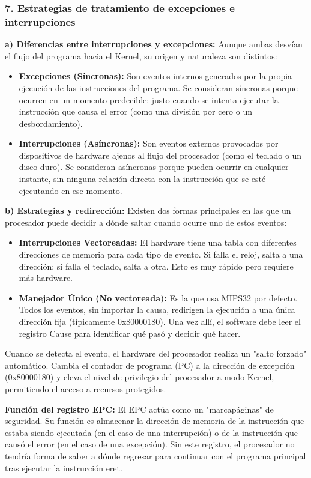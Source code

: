 \documentclass[12pt,a4paper]{article}
\begin{document}
\subsubsection{7. Estrategias de tratamiento de excepciones e interrupciones}

\textbf{a) Diferencias entre interrupciones y excepciones:} Aunque ambas desvían el flujo del programa hacia el Kernel, su origen y naturaleza son distintos:
\begin{itemize}
    \item \textbf{Excepciones (Síncronas):} Son eventos internos generados por la propia ejecución de las instrucciones del programa. Se consideran síncronas porque ocurren en un momento predecible: justo cuando se intenta ejecutar la instrucción que causa el error (como una división por cero o un desbordamiento).
    \item \textbf{Interrupciones (Asíncronas):} Son eventos externos provocados por dispositivos de hardware ajenos al flujo del procesador (como el teclado o un disco duro). Se consideran asíncronas porque pueden ocurrir en cualquier instante, sin ninguna relación directa con la instrucción que se esté ejecutando en ese momento.
\end{itemize}

\textbf{b) Estrategias y redirección:} Existen dos formas principales en las que un procesador puede decidir a dónde saltar cuando ocurre uno de estos eventos:
\begin{itemize}
    \item \textbf{Interrupciones Vectoreadas:} El hardware tiene una tabla con diferentes direcciones de memoria para cada tipo de evento. Si falla el reloj, salta a una dirección; si falla el teclado, salta a otra. Esto es muy rápido pero requiere más hardware.
    \item \textbf{Manejador Único (No vectoreada):} Es la que usa MIPS32 por defecto. Todos los eventos, sin importar la causa, redirigen la ejecución a una única dirección fija (típicamente 0x80000180). Una vez allí, el software debe leer el registro Cause para identificar qué pasó y decidir qué hacer.
\end{itemize}
Cuando se detecta el evento, el hardware del procesador realiza un "salto forzado" automático. Cambia el contador de programa (PC) a la dirección de excepción (0x80000180) y eleva el nivel de privilegio del procesador a modo Kernel, permitiendo el acceso a recursos protegidos. 

\textbf{Función del registro EPC:} El EPC actúa como un "marcapáginas" de seguridad. Su función es almacenar la dirección de memoria de la instrucción que estaba siendo ejecutada (en el caso de una interrupción) o de la instrucción que causó el error (en el caso de una excepción). Sin este registro, el procesador no tendría forma de saber a dónde regresar para continuar con el programa principal tras ejecutar la instrucción eret.
\end{document}
